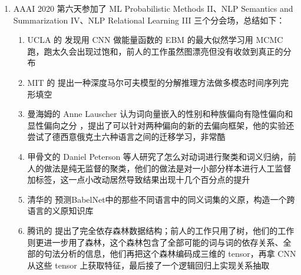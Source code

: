 \documentclass[11pt]{article}
\begin{document}
\begin{enumerate}
\item AAAI 2020 第六天参加了 ML Probabilistic Methods II、NLP Semantics and Summarization IV、NLP Relational Learning III 三个分会场，总结如下：
\begin{enumerate}
\item UCLA 的 \cite{nijkamp2019anatomy} 发现用 CNN 做能量函数的 EBM 的最大似然学习用 MCMC 跑，跑太久会出现过饱和，前人的工作虽然图漂亮但没有收敛到真正的分布
\item MIT 的 \cite{Tan2019FactorizedII} 提出一种深度马尔可夫模型的分解推理方法做多模态时间序列完形填空
\item 曼海姆的 Anne Lauscher 认为词向量嵌入的性别和种族偏向有隐性偏向和显性偏向之分 \cite{Lauscher2019AGF}，提出了可以针对两种偏向的新的去偏向框架，他的实验还尝试了德西意俄克土六种语言之间的迁移学习，非常酷
\item 甲骨文的 Daniel Peterson 等人研究了怎么对动词进行聚类和词义归纳，前人的做法是纯无监督的聚类，他们的做法是对一小部分样本进行人工监督加标签，这一点小改动居然导致结果出现十几个百分点的提升
\item 清华的 \cite{Qi2019TowardsBA} 预测BabelNet中的那些不同语言中的同义词集的义原，构造一个跨语言的义原知识库
\item 腾讯的 \cite{jinrelation} 提出了完全依存森林数据结构；前人的工作只用了树，他们的工作则更进一步用了森林，这个森林包含了全部可能的词与词的依存关系、全部的句法分析的信息，他们再把这个森林编码成三维的 tensor，再拿 CNN 从这些 tensor 上获取特征，最后接了一个逻辑回归上实现关系抽取
\end{enumerate}
\end{enumerate}

\renewcommand\refname{参考文献}


\end{document}
